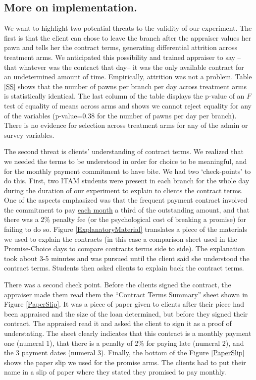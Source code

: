 \documentclass[11pt]{article}
\begin{document}
\subsection{More on implementation.}

We want to highlight two potential threats to the validity of our experiment. The first is that the client can chose to leave the branch after the appraiser values her pawn and tells her the contract terms, generating differential attrition across treatment arms. We anticipated this possibility and trained appraiser to say --that whatever was the contract that day-- it was the only available contract for an undetermined amount of time. Empirically, attrition was not a problem. Table \ref{SS} shows that the number of pawns per branch per day across treatment arms is statistically identical. The last column of the table displays the p-value of an $F$ test of equality of means across arms and shows we cannot reject equality for any of the variables (p-value=0.38 for the number of pawns per day per branch). There is no evidence for selection across treatment arms for any of the admin or survey variables.

The second threat is clients' understanding of contract terms. We realized that we needed the terms to be understood in order for choice to be meaningful, and for the monthly payment commitment to have bite. We had two `check-points' to do this. First, two ITAM students were present in each branch for the whole day during the duration of our experiment to explain to clients the contract terms. One of the aspects emphasized was that the frequent payment contract involved the commitment to pay \underline{each month} a third of the outstanding amount, and that there was a 2\% penalty fee (or the psychological cost of breaking a promise) for failing to do so.  Figure \ref{ExplanatoryMaterial} translates a piece of the materials we used to explain the contracts (in this case a comparison sheet used in the Promise-Choice days to compare contracts terms side to side). The explanation took about 3-5 minutes and was pursued until the client said she understood the contract terms. Students then asked clients to explain back the contract terms. 

There was a second check point. Before the clients signed the contract, the appraiser made them read them the ``Contract Terms Summary'' sheet shown in Figure \ref{PaperSlip}. It was a piece of paper given to clients after their piece had been appraised and the size of the loan determined, but before they signed their contract. The appraised read it and asked the client to sign it as a proof of understating. The sheet clearly indicates that this contract is a monthly payment one (numeral 1), that there is a penalty of 2\% for paying late (numeral 2), and the 3 payment dates (numeral 3). Finally, the bottom of the Figure \ref{PaperSlip} shows the paper slip we used for the promise arms. The clients had to put their name in a slip of paper where they stated they promised to pay monthly.
\end{document}
